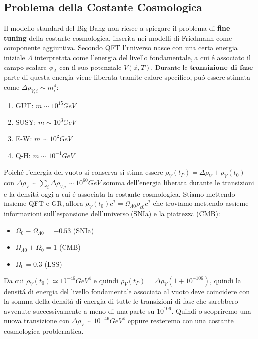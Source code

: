 \documentclass[12pt, a4paper]{article}
\begin{document}
\subsection{Problema della Costante Cosmologica}
Il modello standard del Big Bang non riesce a spiegare il problema di \textbf{fine tuning} della costante cosmologica, inserita nei modelli di Friedmann come componente aggiuntiva. Secondo QFT l'universo nasce con una certa energia iniziale $\Lambda$ interpretata come l'energia del livello fondamentale, a cui \'{e} associato il campo scalare $\phi_{\Lambda}$ con il suo potenziale $V(\phi,T)$. Durante le \textbf{transizione di fase} parte di questa energia viene liberata tramite calore specifico, pu\'{o} essere stimata come $\Delta\rho_{V,i}\sim m_i^4$:
\begin{enumerate}
\item GUT: $m\sim10^{15} GeV$
\item SUSY: $m\sim10^{3} GeV$
\item E-W: $m\sim10^{2} GeV$
\item Q-H: $m\sim10^{-1} GeV$
\end{enumerate}
Poich\'{e} l'energia del vuoto si conserva si stima essere $\rho_V(t_P)= \Delta \rho_V+\rho_V(t_0)$ con  $\Delta\rho_V\sim \sum_i \Delta\rho_{V,i} \sim 10^{60} GeV$ somma dell'energia liberata durante le transizioni e la densit\'{a} oggi a cui \'{e} associata la costante cosmologica. Stiamo mettendo insieme QFT e GR, allora $\rho_V(t_0)c^2=\Omega_{\Lambda0}\rho_{c0}c^2$ che troviamo mettendo assieme informazioni sull'espansione dell'universo (SNIa) e la piattezza (CMB):
\begin{itemize}
\item $\Omega_0-\Omega_{\Lambda0}=-0.53$ (SNIa)
\item $\Omega_{\Lambda0}+\Omega_0=1$ (CMB)
\item $\Omega_0=0.3$ (LSS)
\end{itemize}
Da cui $\rho_V(t_0)\simeq10^{-46} GeV^4$ e quindi $\rho_V(t_P)= \Delta \rho_V(1+ 10^{-106})$, quindi la densit\'{a} di energia del livello fondamentale associata al vuoto deve coincidere con la somma della densit\'{a} di energia di tutte le transizioni di fase che sarebbero avvenute successivamente a meno di una parte su $10^{106}$. Quindi o scopriremo una nuova transizione con $\Delta\rho_{V}\sim 10^{-46} GeV^{4}$ oppure resteremo con una costante cosmologica problematica.
\end{document}
